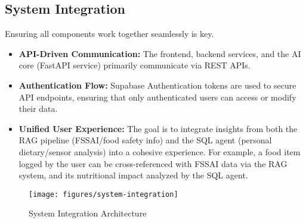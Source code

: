 \subsection{System Integration}
Ensuring all components work together seamlessly is key.
\begin{itemize}
    \item \textbf{API-Driven Communication:} The frontend, backend services, and the AI core (FastAPI service) primarily communicate via REST APIs.
    \item \textbf{Authentication Flow:} Supabase Authentication tokens are used to secure API endpoints, ensuring that only authenticated users can access or modify their data.
    \item \textbf{Unified User Experience:} The goal is to integrate insights from both the RAG pipeline (FSSAI/food safety info) and the SQL agent (personal dietary/sensor analysis) into a cohesive experience. For example, a food item logged by the user can be cross-referenced with FSSAI data via the RAG system, and its nutritional impact analyzed by the SQL agent.
\end{itemize}

\begin{figure}[!t]
\centering
\texttt{[image: figures/system-integration]}
\caption{System Integration Architecture}
\label{fig:system-integration}
\end{figure} 